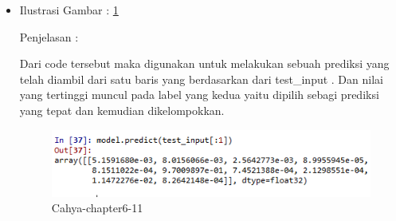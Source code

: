 \begin{enumerate}
\begin{itemize}
\begin{itemize}
\par
\item Ilustrasi Gambar : \ref{cahya-chapter6-11}
\par Penjelasan :
\par Dari code tersebut maka digunakan untuk melakukan sebuah prediksi yang telah diambil dari satu baris yang berdasarkan dari test\_input . Dan nilai yang tertinggi muncul pada label yang kedua yaitu dipilih sebagi prediksi yang tepat dan kemudian dikelompokkan.
\par
\par
\begin{figure}[!hbtp]
\centering
\includegraphics[scale=0.2]{figures/cahya-cahpter-6-11.png}
\caption{Cahya-chapter6-11}
\label{cahya-chapter6-11}
\end{figure}
\par
\par
\par
\par
\par
\par
\par
\par
\par
\end{itemize}

\par
\par
\par

\end{itemize}
\end{enumerate}
